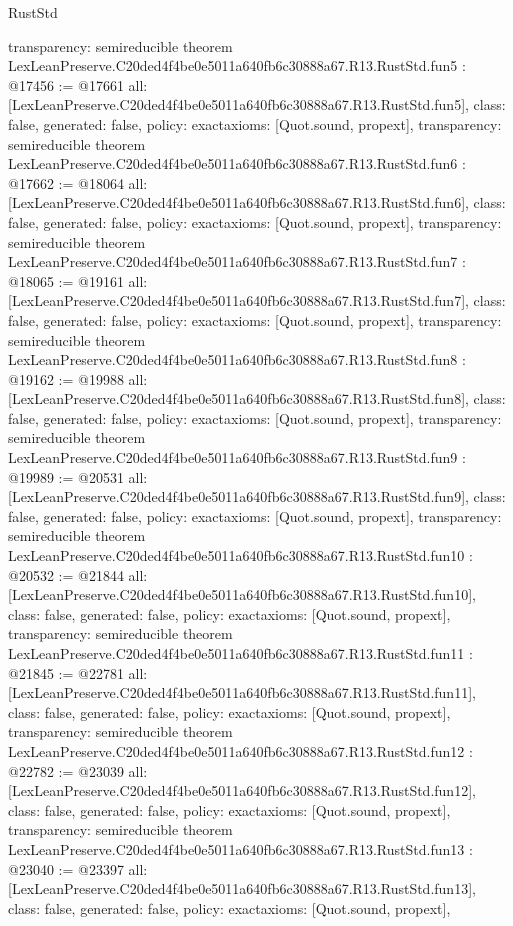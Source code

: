 \begin{lexlean}{RustStd}
\begin{coremodule}
{  transparency: semireducible
}
theorem LexLeanPreserve.C20ded4f4be0e5011a640fb6c30888a67.R13.RustStd.fun5 : @17456 := @17661 {
  all: [LexLeanPreserve.C20ded4f4be0e5011a640fb6c30888a67.R13.RustStd.fun5],
  class: false,
  generated: false,
  policy: exact{axioms: [Quot.sound, propext]},
  transparency: semireducible
}
theorem LexLeanPreserve.C20ded4f4be0e5011a640fb6c30888a67.R13.RustStd.fun6 : @17662 := @18064 {
  all: [LexLeanPreserve.C20ded4f4be0e5011a640fb6c30888a67.R13.RustStd.fun6],
  class: false,
  generated: false,
  policy: exact{axioms: [Quot.sound, propext]},
  transparency: semireducible
}
theorem LexLeanPreserve.C20ded4f4be0e5011a640fb6c30888a67.R13.RustStd.fun7 : @18065 := @19161 {
  all: [LexLeanPreserve.C20ded4f4be0e5011a640fb6c30888a67.R13.RustStd.fun7],
  class: false,
  generated: false,
  policy: exact{axioms: [Quot.sound, propext]},
  transparency: semireducible
}
theorem LexLeanPreserve.C20ded4f4be0e5011a640fb6c30888a67.R13.RustStd.fun8 : @19162 := @19988 {
  all: [LexLeanPreserve.C20ded4f4be0e5011a640fb6c30888a67.R13.RustStd.fun8],
  class: false,
  generated: false,
  policy: exact{axioms: [Quot.sound, propext]},
  transparency: semireducible
}
theorem LexLeanPreserve.C20ded4f4be0e5011a640fb6c30888a67.R13.RustStd.fun9 : @19989 := @20531 {
  all: [LexLeanPreserve.C20ded4f4be0e5011a640fb6c30888a67.R13.RustStd.fun9],
  class: false,
  generated: false,
  policy: exact{axioms: [Quot.sound, propext]},
  transparency: semireducible
}
theorem LexLeanPreserve.C20ded4f4be0e5011a640fb6c30888a67.R13.RustStd.fun10 : @20532 := @21844 {
  all: [LexLeanPreserve.C20ded4f4be0e5011a640fb6c30888a67.R13.RustStd.fun10],
  class: false,
  generated: false,
  policy: exact{axioms: [Quot.sound, propext]},
  transparency: semireducible
}
theorem LexLeanPreserve.C20ded4f4be0e5011a640fb6c30888a67.R13.RustStd.fun11 : @21845 := @22781 {
  all: [LexLeanPreserve.C20ded4f4be0e5011a640fb6c30888a67.R13.RustStd.fun11],
  class: false,
  generated: false,
  policy: exact{axioms: [Quot.sound, propext]},
  transparency: semireducible
}
theorem LexLeanPreserve.C20ded4f4be0e5011a640fb6c30888a67.R13.RustStd.fun12 : @22782 := @23039 {
  all: [LexLeanPreserve.C20ded4f4be0e5011a640fb6c30888a67.R13.RustStd.fun12],
  class: false,
  generated: false,
  policy: exact{axioms: [Quot.sound, propext]},
  transparency: semireducible
}
theorem LexLeanPreserve.C20ded4f4be0e5011a640fb6c30888a67.R13.RustStd.fun13 : @23040 := @23397 {
  all: [LexLeanPreserve.C20ded4f4be0e5011a640fb6c30888a67.R13.RustStd.fun13],
  class: false,
  generated: false,
  policy: exact{axioms: [Quot.sound, propext]},
}
\end{coremodule}
\end{lexlean}
